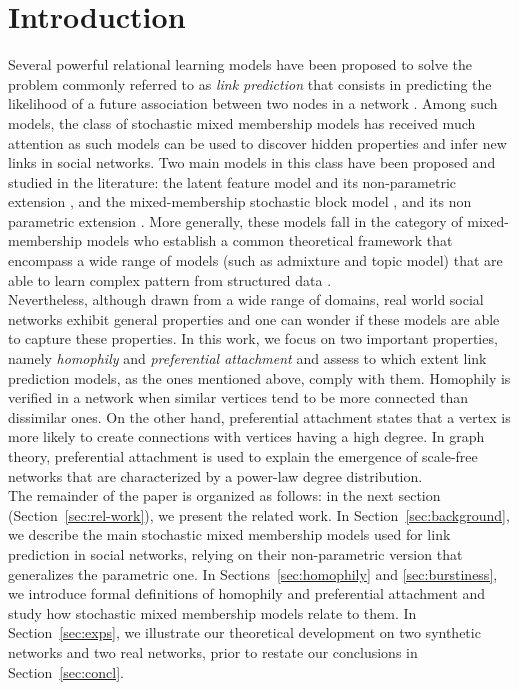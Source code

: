 
\section{Introduction}
\label{sec:intro}

Several powerful relational learning models have been proposed to solve the problem commonly referred to as \textit{link prediction} that consists in predicting the likelihood of a future association between two nodes in a network \cite{LibenNowell07,HassanZaki11}. Among such models, the class of stochastic mixed membership models has received much attention as such models can be used to discover hidden properties and infer new links in social networks. Two main models in this class have been proposed and studied in the literature: the latent feature model \cite{BMF} and its non-parametric extension \cite{ILFRM}, and the mixed-membership stochastic block model \cite{MMSB}, and its non parametric extension \cite{iMMSB,fan2015dynamic}. More generally, these models fall in the category of mixed-membership models who establish a common theoretical framework that encompass a wide range of models (such as admixture and topic model) that are able to  learn complex pattern from structured data \cite{airoldi2014handbook}.~\\

Nevertheless, although drawn from a wide range of domains, real world social networks exhibit general properties and one can wonder if these models are able to capture these properties. In this work, we focus on two important properties, namely \textit{homophily} and \textit{preferential attachment} \cite{Newman2010, Barabasi2003} and assess to which extent link prediction models, as the ones mentioned above, comply with them. Homophily is verified in a network when similar vertices tend to be more connected than dissimilar ones. On the other hand, preferential attachment states that a vertex is more likely to create connections with vertices having a high degree. In graph theory, preferential attachment is used to explain the emergence of scale-free networks that are characterized by a power-law degree distribution.~\\

The remainder of the paper is organized as follows: in the next section (Section~\ref{sec:rel-work}), we present the related work. In Section~\ref{sec:background}, we describe the main stochastic mixed membership models used for link prediction in social networks, relying on their non-parametric version that generalizes the parametric one. In Sections~\ref{sec:homophily} and \ref{sec:burstiness}, we introduce formal definitions of homophily and preferential attachment and study how stochastic mixed membership models relate to them. In Section~\ref{sec:exps}, we illustrate our theoretical development on two synthetic networks and two real networks, prior to restate our conclusions in Section~\ref{sec:concl}.

